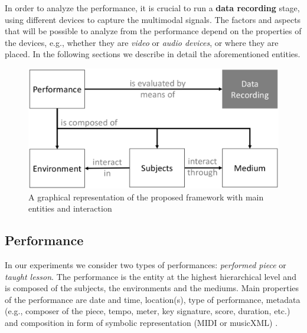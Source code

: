 


In order to analyze the performance, it is crucial to run a \textbf{data recording} stage, using different devices to capture the multimodal signals. The factors and aspects that will be possible to analyze from the performance depend on the properties of the devices, e.g., whether they are \textit{video} or \textit{audio devices}, or where they are placed. In the following sections we describe in detail the aforementioned entities.



\begin{figure}[t]
	\centering
	\includegraphics[width=\columnwidth]{img/framework.eps}
	\caption{A graphical representation of the proposed framework with main entities and interaction}
	\label{fig:framework}
\end{figure}

\subsection{Performance}
In our experiments we consider two types of performances: \textit{performed piece} or \textit{taught lesson}. The performance is the entity at the highest hierarchical level and is composed of the subjects, the environments and the mediums. 
Main properties of the performance are date and time, location(s), type of performance, metadata (e.g., composer of the piece, tempo, meter, key signature, score, duration, etc.) and composition in form of symbolic representation (MIDI or musicXML) \cite{MIDItoolbox}. 

